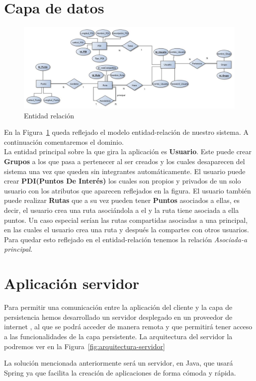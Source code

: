 \section{Capa de datos}
\begin{figure}[H]
		\centering
		\includegraphics[width=\textwidth] {BD.jpg}
		\caption{Entidad relación  }\label{fig:BD}
	\end{figure}
	En la Figura~\ref{fig:BD} queda reflejado el modelo  entidad-relación de nuestro sistema. A continuación comentaremos el dominio.\\
La entidad principal sobre la que gira la aplicación es \textbf{Usuario}. Este puede crear \textbf{Grupos} a los que pasa a pertenecer al ser creados y los cuales desaparecen del sistema una vez que queden sin integrantes automáticamente.  El usuario puede crear \textbf{PDI(Puntos De Interés)} los cuales son propios y privados de un solo usuario con los atributos que aparecen reflejados en la figura. El usuario también puede realizar \textbf{Rutas} que a su vez pueden tener \textbf{Puntos} asociados a ellas, es decir, el  usuario crea una ruta asociándola a el y la ruta tiene asociada a ella puntos.
 Un caso especial serían las rutas compartidas asociadas a una principal, en las cuales el usuario crea una ruta y después la compartes con otros usuarios. Para  quedar esto reflejado en el entidad-relación tenemos la relación \textit{Asociada-a principal}.
	
\section{Aplicación servidor}
Para permitir una comunicación entre la aplicación del cliente y la capa de persistencia hemos desarrollado un servidor desplegado en un proveedor de internet , al que se podrá acceder de manera remota y que permitirá tener acceso a las funcionalidades de la capa persistente. La arquitectura del servidor la podremos ver en la Figura~\ref{fig:arquitectura-servidor}

La solución mencionada anteriormente será un servidor, en Java, que  usará Spring ya que facilita la creación de aplicaciones de forma cómoda y rápida.\\

